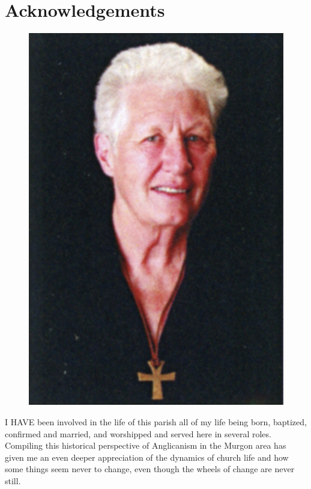 \printendnotes[custom]
\setcounter{endnote}{0}


\chapter{Acknowledgements}
\nobalance








\begin{figure}
\begin{center}
\includegraphics[width=.8\linewidth,center]{../images/theAuthor.jpg}
\caption{\itshape  }
\end{center}
\end{figure}




\lettrine[lines=3]{I}{ HAVE}
 been involved in the life of this parish all of my life being born, baptized, confirmed and married, and worshipped and served here in several roles. Compiling this historical perspective of Anglicanism in the Murgon area has given me an even deeper appreciation of the dynamics of church life and how some things seem never to change, even though the wheels of change are never still.

